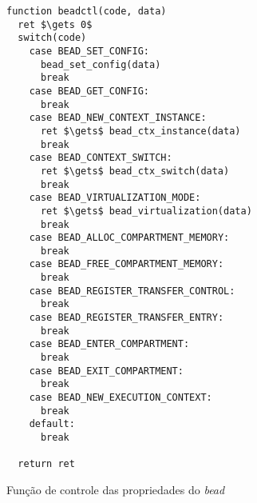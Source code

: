 \begin{pseudocode}

\begin{lstlisting}[language=pseudocode, style=pseudocode]
function beadctl(code, data)
  ret $\gets 0$
  switch(code)
    case BEAD_SET_CONFIG:
      bead_set_config(data)
      break
    case BEAD_GET_CONFIG:
      break
    case BEAD_NEW_CONTEXT_INSTANCE:
      ret $\gets$ bead_ctx_instance(data)
      break
    case BEAD_CONTEXT_SWITCH:
      ret $\gets$ bead_ctx_switch(data)
      break
    case BEAD_VIRTUALIZATION_MODE:
      ret $\gets$ bead_virtualization(data)
      break
    case BEAD_ALLOC_COMPARTMENT_MEMORY:
      break
    case BEAD_FREE_COMPARTMENT_MEMORY:
      break
    case BEAD_REGISTER_TRANSFER_CONTROL:
      break
    case BEAD_REGISTER_TRANSFER_ENTRY:
      break
    case BEAD_ENTER_COMPARTMENT:
      break
    case BEAD_EXIT_COMPARTMENT:
      break
    case BEAD_NEW_EXECUTION_CONTEXT:
      break
    default:
      break

  return ret

\end{lstlisting}

  \caption{Função de controle das propriedades do \emph{bead}}
  \label{alg:ctlbead}
\end{pseudocode}
